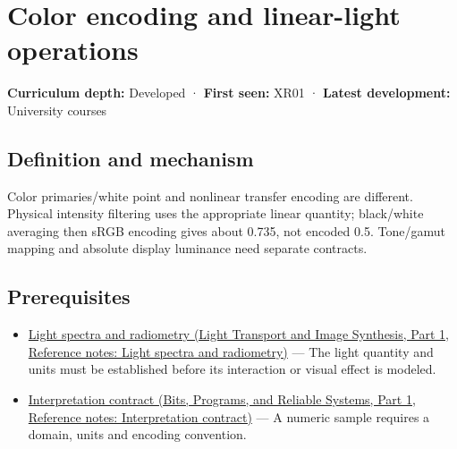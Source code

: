 \hypertarget{appendix-a9f83ad40792}{}\label{referencestart:appendix-a9f83ad40792}
\section{Color encoding and linear-light operations}\label{appendix-a9f83ad40792-color-encoding-and-linear-light-operations}

\hypertarget{appendix-a9f83ad40792-color-encoding-and-linear-light-operations}{}

\textbf{Curriculum depth:} Developed · \textbf{First seen:} XR01 · \textbf{Latest development:} University courses

\begin{allmightroledefinition}

\subsection{Definition and mechanism}\label{appendix-a9f83ad40792-definition-and-mechanism}

\hypertarget{appendix-a9f83ad40792-definition-and-mechanism}{}

Color primaries/white point and nonlinear transfer encoding are different. Physical intensity filtering uses the appropriate linear quantity; black/white averaging then sRGB encoding gives about 0.735, not encoded 0.5. Tone/gamut mapping and absolute display luminance need separate contracts.

\end{allmightroledefinition}

\subsection{Prerequisites}\label{appendix-a9f83ad40792-prerequisites}

\hypertarget{appendix-a9f83ad40792-prerequisites}{}

\begin{itemize}
\tightlist
\item
  \href{../04-Light-Transport-and-Image-Synthesis-P01/main.pdf\#nameddest=appendix-215c2570199b}{Light spectra and radiometry (Light Transport and Image Synthesis, Part 1, Reference notes: Light spectra and radiometry)} --- The light quantity and units must be established before its interaction or visual effect is modeled.
\item
  \href{../01-Bits-Programs-and-Reliable-Systems-P01/main.pdf\#nameddest=appendix-f414bd4ed05c}{Interpretation contract (Bits, Programs, and Reliable Systems, Part 1, Reference notes: Interpretation contract)} --- A numeric sample requires a domain, units and encoding convention.
\end{itemize}


